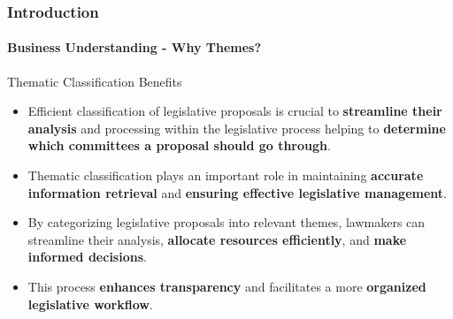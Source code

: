 \begin{frame}
	\frametitle{Introduction}
	\framesubtitle{Business Understanding - Why Themes?}
	\begin{block}{Thematic Classification Benefits} %
		\begin{itemize}
			\item Efficient classification of legislative proposals is crucial to \textbf{streamline their analysis} and processing within the legislative process helping to \textbf{determine which committees a proposal should go through}.
					
					
			\item Thematic classification plays an important role in maintaining \textbf{accurate information retrieval} and \textbf{ensuring effective legislative management}.
			
			
			\item By categorizing legislative proposals into relevant themes, lawmakers can streamline their analysis, \textbf{allocate resources efficiently}, and \textbf{make informed decisions}. 
			
				
			\item This process \textbf{enhances transparency} and facilitates a more \textbf{organized legislative workflow}.	
		\end{itemize}
	\end{block}
\end{frame}
